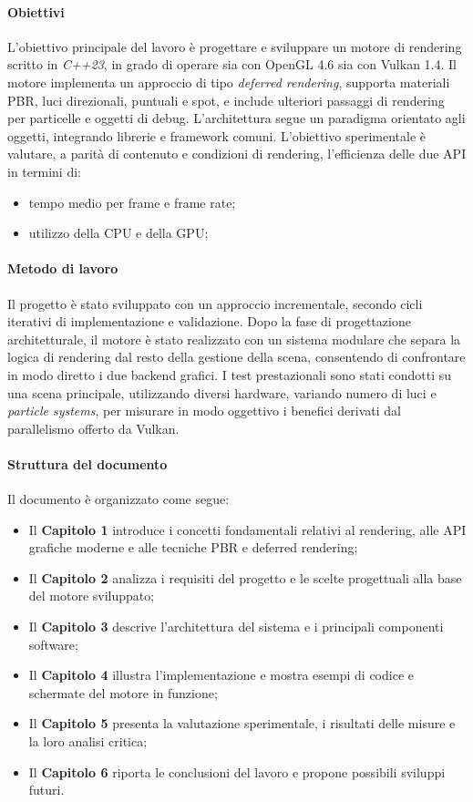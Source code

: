\documentclass[12pt,a4paper,openright,twoside]{book}
\begin{document}
\paragraph{Obiettivi}
L’obiettivo principale del lavoro è progettare e sviluppare un motore di rendering scritto in \emph{C++23},
in grado di operare sia con OpenGL 4.6 sia con Vulkan 1.4.
Il motore implementa un approccio di tipo \emph{deferred rendering}, supporta materiali \ac{PBR}, luci direzionali,
puntuali e spot, e include ulteriori passaggi di rendering per particelle e oggetti di debug.
L’architettura segue un paradigma orientato agli oggetti, integrando librerie e framework comuni.
L’obiettivo sperimentale è valutare, a parità di contenuto e condizioni di rendering, l’efficienza delle due API 
in termini di:
\begin{itemize}
    \item tempo medio per frame e frame rate;
    \item utilizzo della CPU e della GPU;
\end{itemize}

\paragraph{Metodo di lavoro}
Il progetto è stato sviluppato con un approccio incrementale, secondo cicli iterativi di implementazione e validazione.  
Dopo la fase di progettazione architetturale, il motore è stato realizzato con un sistema modulare che separa la logica
di rendering dal resto della gestione della scena, consentendo di confrontare in modo diretto i due backend grafici.  
I test prestazionali sono stati condotti su una scena principale, utilizzando diversi hardware, variando numero di luci
e \emph{particle systems}, per misurare in modo oggettivo i benefici derivati dal parallelismo offerto da Vulkan.

\paragraph{Struttura del documento}
Il documento è organizzato come segue:
\begin{itemize}
   \item Il \textbf{Capitolo 1} introduce i concetti fondamentali relativi al rendering, alle \ac{API} grafiche moderne e alle tecniche \ac{PBR} e deferred rendering;
   \item Il \textbf{Capitolo 2} analizza i requisiti del progetto e le scelte progettuali alla base del motore sviluppato;
   \item Il \textbf{Capitolo 3} descrive l’architettura del sistema e i principali componenti software;
   \item Il \textbf{Capitolo 4} illustra l’implementazione e mostra esempi di codice e schermate del motore in funzione;
   \item Il \textbf{Capitolo 5} presenta la valutazione sperimentale, i risultati delle misure e la loro analisi critica;
   \item Il \textbf{Capitolo 6} riporta le conclusioni del lavoro e propone possibili sviluppi futuri.
\end{itemize}
\end{document}
